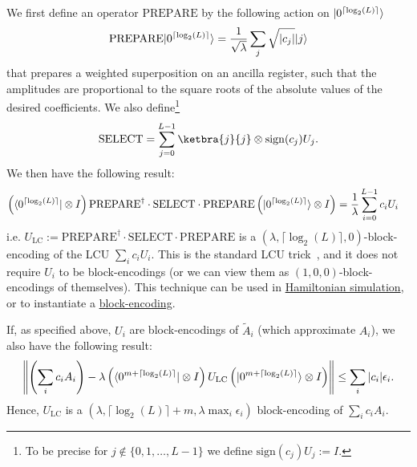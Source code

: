 \begin{refsection}
We first define an operator $\mathrm{PREPARE}$ by the following action on $\lvert0^{\lceil \log_2(L)\rceil}\rangle$
\begin{equation}
       \mathrm{PREPARE}  \lvert0^{\lceil \log_2(L)\rceil }\rangle = \frac{1}{\sqrt{\lambda}} \sum_j \sqrt{|c_j|} \lvert j\rangle
\end{equation}
that prepares a weighted superposition on an ancilla register, such that the amplitudes are proportional to the square roots of the absolute values of the desired coefficients. We also define\footnote{To be precise for $j\notin\{0,1,\ldots,L-1\}$ we define $\mathrm{sign}(c_j) U_j:=I$.}
\begin{equation}
    \mathrm{SELECT} = \sum_{j=0}^{L-1} \ketbra{j}{j} \otimes \mathrm{sign}(c_j) U_j.
\end{equation}
We then have the following result:
\begin{align}\label{Eq:LCU}
    \left(\langle0^{\lceil \log_2(L)\rceil}\rvert \otimes I \right)  \mathrm{PREPARE}^\dag \cdot  \mathrm{SELECT} \cdot \mathrm{PREPARE} \left( \lvert0^{\lceil \log_2(L)\rceil}\rangle \otimes I \right) &= \frac{1}{\lambda} \sum_{i=0}^{L-1} c_i U_i
\end{align}
i.e. $U_{\mathrm{LC}} := \mathrm{PREPARE}^\dag \cdot  \mathrm{SELECT} \cdot \mathrm{PREPARE}$ is a $(\lambda, \lceil \log_2(L)\rceil, 0)$-block-encoding of the LCU $\sum_i c_i U_i$. This is the standard LCU trick~\cite{childs2012HamSimLCU}, and it does not require $U_i$ to be block-encodings (or we can view them as $(1, 0, 0)$-block-encodings of themselves). This technique can be used in \hyperref[prim:TaylorDyson]{Hamiltonian simulation}, or to instantiate a \hyperref[prim:BlockEncodings]{block-encoding}. 

If, as specified above, $U_i$ are block-encodings of $\tilde{A}_i$ (which approximate $A_i$), we also have the following result:
\begin{align}
    \left\lVert\left( \sum_i c_i A_i \right) - \lambda \left(\langle0^{m+\lceil \log_2(L)\rceil}\rvert \otimes I \right) U_{\mathrm{LC}} \left(\lvert0^{m + \lceil \log_2(L)\rceil}\rangle \otimes I \right) \right\rVert \leq \sum_i |c_i|\epsilon_i.
\end{align}
Hence, $U_{\mathrm{LC}}$ is a $(\lambda, \lceil \log_2(L)\rceil + m, \lambda \max_i \epsilon_i)$ block-encoding of $\sum_i c_i A_i$.



\end{refsection}
